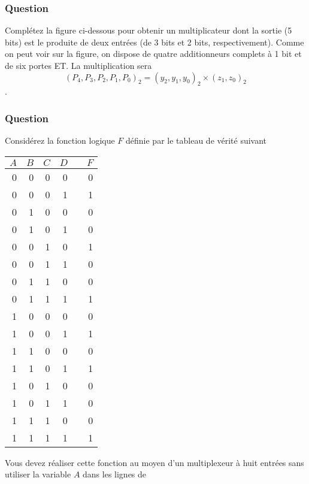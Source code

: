 \documentclass[11pt]{article}
\begin{document}
\subsubsection*{Question}
\label{sec:orgcdc2206}
Complétez la figure ci-dessous pour obtenir un multiplicateur dont
  la sortie (5 bits) est le produite de deux entrées (de 3 bits et 2
  bits, respectivement). Comme on peut voir sur la figure, on dispose
  de quatre additionneurs complets à 1 bit et de six portes ET. La
  multiplication sera $$(P_4, P_3, P_2, P_1, P_0)_2 = (y_2, y_1, y_0)_2
    \times (z_1, z_0)_2$$.
  \begin{center}

\end{center}

\subsubsection*{Question}
\label{sec:org47e9b27}
Considérez la fonction logique \(F\) définie par le tableau de vérité suivant
\begin{center}
\begin{tabular}{rrrrlr}
\(A\) & \(B\) & \(C\) & \(D\) &  & \(F\)\\[0pt]
\hline
0 & 0 & 0 & 0 &  & 0\\[0pt]
0 & 0 & 0 & 1 &  & 1\\[0pt]
0 & 1 & 0 & 0 &  & 0\\[0pt]
0 & 1 & 0 & 1 &  & 0\\[0pt]
0 & 0 & 1 & 0 &  & 1\\[0pt]
0 & 0 & 1 & 1 &  & 0\\[0pt]
0 & 1 & 1 & 0 &  & 0\\[0pt]
0 & 1 & 1 & 1 &  & 1\\[0pt]
1 & 0 & 0 & 0 &  & 0\\[0pt]
1 & 0 & 0 & 1 &  & 1\\[0pt]
1 & 1 & 0 & 0 &  & 0\\[0pt]
1 & 1 & 0 & 1 &  & 1\\[0pt]
1 & 0 & 1 & 0 &  & 0\\[0pt]
1 & 0 & 1 & 1 &  & 0\\[0pt]
1 & 1 & 1 & 0 &  & 0\\[0pt]
1 & 1 & 1 & 1 &  & 1\\[0pt]
\end{tabular}
\end{center}
Vous devez réaliser cette fonction au moyen d'un multiplexeur à huit
entrées sans utiliser la variable \(A\) dans les lignes de
\end{document}
